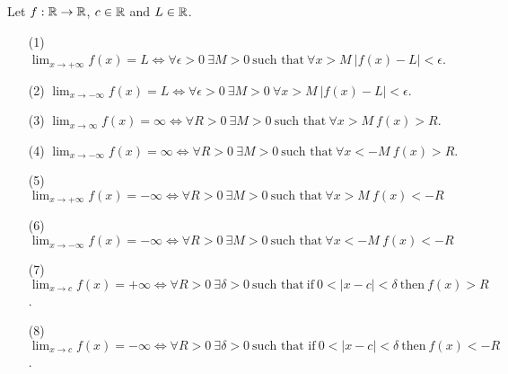 \documentclass[a4paper]{article}
\begin{document}
Let \( f: \mathbb{R} \to \mathbb{R}  \), \( c \in \mathbb{R}  \) and \( L \in \mathbb{R}  \). 

\begin{enumerate}
    \item[(1)] \( \lim_{ x \to + \infty  } f(x) = L \iff \forall \epsilon > 0 \ \exists M > 0 \ \text{such that} \ \forall x > M \ | f(x) - L | < \epsilon \).
    \item[(2)] \( \lim_{ x \to - \infty   }  f(x) = L \iff \forall \epsilon > 0 \ \exists M > 0 \ \forall x > M \ | f(x) - L  | < \epsilon   \).
    \item[(3)] \( \lim_{ x \to \infty  } f(x) = \infty \iff \forall R > 0 \ \exists M > 0 \ \text{such that} \ \forall x > M \ f(x) > R  \).
    \item[(4)] \( \lim_{ x \to - \infty   }  f(x) = \infty \iff \forall R > 0 \ \exists M > 0 \ \text{such that} \ \forall x < - M  \ f(x) > R  \).
    \item[(5)] \( \lim_{ x \to + \infty  } f(x) = - \infty \iff \forall R > 0 \ \exists M > 0 \ \text{such that} \ \forall x > M \ f(x) < - R   \) 
    \item[(6)] \( \lim_{ x \to - \infty  } f(x) = - \infty \iff \forall R > 0 \ \exists M > 0 \ \text{such that} \ \forall x < - M  \ f(x) < - R  \)
    \item[(7)] \( \lim_{ x \to c }  f(x) = + \infty \iff \forall R > 0 \ \exists \delta > 0 \ \text{such that} \ \text{if} \ 0 < |  x - c  | < \delta \ \text{then} \ f(x) > R  \).
    \item[(8)] \( \lim_{ x \to c } f(x) = - \infty \iff \forall R > 0 \ \exists \delta  > 0 \ \text{such that if} \ 0 < | x - c  |  < \delta \ \text{then} \ f(x) < - R  \).
\end{enumerate}
\end{document}
